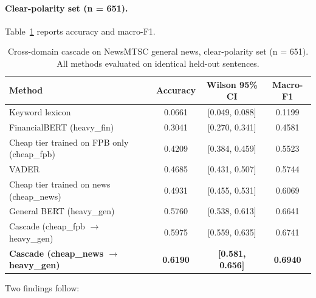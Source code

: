 \documentclass{article}
\begin{document}
\paragraph{Clear-polarity set (n = 651).}
Table~\ref{tab:newsmt_clear} reports accuracy and macro-F1.

\begin{table}[ht]
\centering
\caption{Cross-domain cascade on NewsMTSC general news, clear-polarity set (n = 651). All methods evaluated on identical held-out sentences.}
\label{tab:newsmt_clear}
\small
\begin{tabular}{lccc}
\toprule
Method & Accuracy & Wilson 95\% CI & Macro-F1 \\
\midrule
Keyword lexicon & 0.0661 & [0.049, 0.088] & 0.1199 \\
FinancialBERT (heavy\_fin) & 0.3041 & [0.270, 0.341] & 0.4581 \\
Cheap tier trained on FPB only (cheap\_fpb) & 0.4209 & [0.384, 0.459] & 0.5523 \\
VADER & 0.4685 & [0.431, 0.507] & 0.5744 \\
Cheap tier trained on news (cheap\_news) & 0.4931 & [0.455, 0.531] & 0.6069 \\
General BERT (heavy\_gen) & 0.5760 & [0.538, 0.613] & 0.6641 \\
Cascade (cheap\_fpb $\rightarrow$ heavy\_gen) & 0.5975 & [0.559, 0.635] & 0.6741 \\
\textbf{Cascade (cheap\_news $\rightarrow$ heavy\_gen)} & \textbf{0.6190} & \textbf{[0.581, 0.656]} & \textbf{0.6940} \\
\bottomrule
\end{tabular}
\end{table}

Two findings follow:
\end{document}
